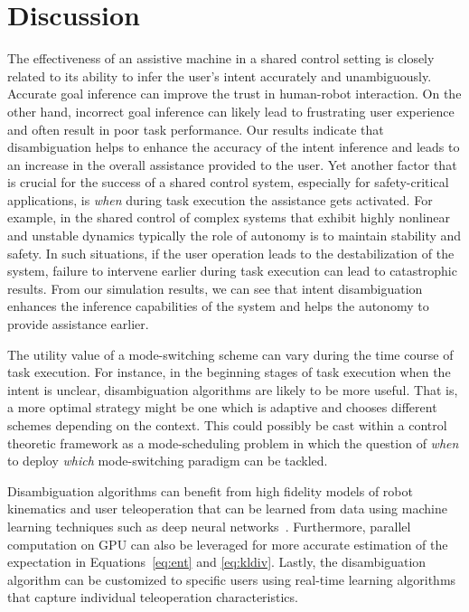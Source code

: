 \documentclass[conference]{IEEEtran}
\begin{document}
\section{Discussion}\label{sec:discussions}

The effectiveness of an assistive machine in a shared control setting is closely related to its ability to infer the user's intent accurately and unambiguously. Accurate goal inference can improve the trust in human-robot interaction. On the other hand, incorrect goal inference can likely lead to frustrating user experience and often result in poor task performance. Our results indicate that disambiguation helps to enhance the accuracy of the intent inference and leads to an increase in the overall assistance provided to the user. Yet another factor that is crucial for the success of a shared control system, especially for safety-critical applications, is \textit{when} during task execution the assistance gets activated. For example, in the shared control of complex systems that exhibit highly nonlinear and unstable dynamics typically the role of autonomy is to maintain stability and safety. In such situations, if the user operation leads to the destabilization of the system, failure to intervene earlier during task execution can lead to catastrophic results. From our simulation results, we can see that intent disambiguation enhances the inference capabilities of the system and helps the autonomy to provide assistance earlier.

The utility value of a mode-switching scheme can vary during the time course of task execution. For instance, in the beginning stages of task execution when the intent is unclear, disambiguation algorithms are likely to be more useful. That is, a more optimal strategy might be one which is adaptive and chooses different schemes depending on the context. This could possibly be cast within a control theoretic framework as a mode-scheduling problem in which the question of \textit{when} to deploy \textit{which} mode-switching paradigm can be tackled.

Disambiguation algorithms can benefit from high fidelity models of robot kinematics and user teleoperation that can be learned from data using machine learning techniques such as deep neural networks~\citep{nagabandi2017neural}. Furthermore, parallel computation on GPU can also be leveraged for more accurate estimation of the expectation in Equations~\ref{eq:ent} and \ref{eq:kldiv}. Lastly, the disambiguation algorithm can be customized to specific users using real-time learning algorithms that capture individual teleoperation characteristics.
\end{document}
